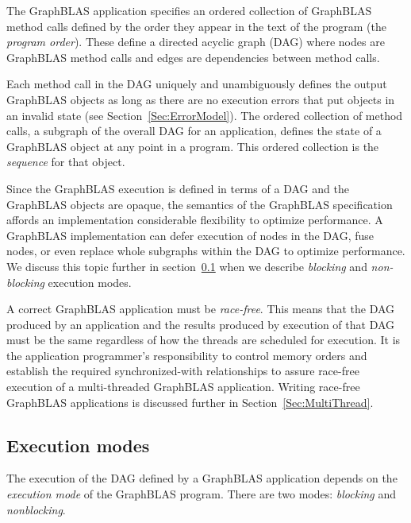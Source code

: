 The GraphBLAS application specifies an ordered collection of 
GraphBLAS method calls defined by the order
they appear in the text of the program (the \emph{program order}).  
These define a directed acyclic graph (DAG) where nodes are GraphBLAS
method calls and edges are dependencies between method calls.  

Each method call in the DAG uniquely and unambiguously defines the output
GraphBLAS objects as long as there are no execution errors that
put objects in an invalid state (see Section~\ref{Sec:ErrorModel}).
The ordered collection of method calls, a subgraph of the overall DAG for an 
application, defines the state of a GraphBLAS object at any point in a program.  
This ordered collection is the \emph{sequence} for that object.  

Since the GraphBLAS execution is defined in terms of a DAG and the 
GraphBLAS objects are opaque, the semantics of the GraphBLAS specification
affords an implementation considerable flexibility to optimize performance.  A 
GraphBLAS implementation can defer execution of nodes in the DAG, fuse nodes, or 
even replace whole subgraphs within the DAG to optimize performance.  We discuss 
this topic further in section~\ref{Sec:Modes} when we describe 
\emph{blocking} and \emph{non-blocking} execution modes.

A correct GraphBLAS application must be \emph{race-free}.  This means that the 
DAG produced by an application and the results produced by execution of that 
DAG must be the same regardless of how the threads are scheduled for execution.  
It is the application programmer's 
responsibility to control memory orders and establish the required synchronized-with
relationships to assure race-free execution of a multi-threaded GraphBLAS 
application.  Writing race-free GraphBLAS applications is discussed further in 
Section~\ref{Sec:MultiThread}.

\subsection{Execution modes}
\label{Sec:Modes}

The execution of the DAG defined by a GraphBLAS application depends on the
\emph{execution mode} of the GraphBLAS program.  There are two modes:
\emph{blocking} and \emph{nonblocking}.

